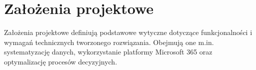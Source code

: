 \section{Założenia projektowe}
Założenia projektowe definiują podstawowe wytyczne dotyczące funkcjonalności i wymagań technicznych tworzonego rozwiązania. Obejmują one m.in. systematyzację danych, wykorzystanie platformy Microsoft 365 oraz optymalizację procesów decyzyjnych.



